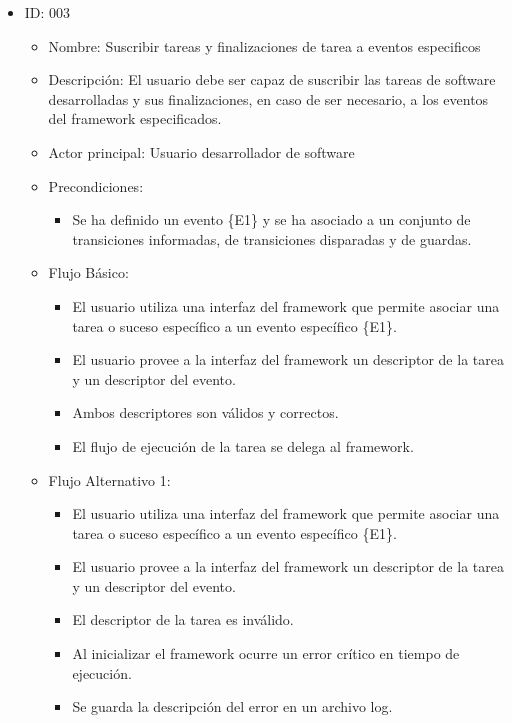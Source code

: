 \begin{itemize}
    \item ID: 003
    \begin{itemize}
        \item Nombre: Suscribir tareas y finalizaciones de tarea a
        eventos especificos
        \item Descripción: El usuario debe ser capaz de suscribir las tareas de
        software desarrolladas y sus finalizaciones, en caso de ser necesario, a
        los eventos del framework especificados.
       	\item Actor principal: Usuario desarrollador de software
       	\item Precondiciones: 
       		\begin{itemize}
       		    \item Se ha definido  un evento \{E1\} y se ha asociado a un
       		    conjunto de transiciones informadas, de transiciones disparadas y de guardas.
   		    \end{itemize}
    	\item Flujo Básico: 
       		\begin{itemize}
       		    \item El usuario utiliza una interfaz del framework que permite
       		    asociar una tarea o suceso específico a un evento específico
       		    \{E1\}.
       		    \item El usuario provee a la interfaz del framework un descriptor
       		    de la tarea y un descriptor del evento.
       		    \item Ambos descriptores son válidos y correctos.
       		    \item El flujo de ejecución de la tarea se delega al
       		    framework.
   		    \end{itemize}
       	\item Flujo Alternativo 1: 
       		\begin{itemize}
       		    \item El usuario utiliza una interfaz del framework que permite
       		    asociar una tarea o suceso específico a un evento específico
       		    \{E1\}.
       		    \item El usuario provee a la interfaz del framework un descriptor
       		    de la tarea y un descriptor del evento.
       		    \item El descriptor de la tarea es inválido.
       		    \item Al inicializar el framework ocurre un error crítico en tiempo
       		    de ejecución.
       		    \item Se guarda la descripción del error en un archivo log.

\end{itemize}
\end{itemize}
\end{itemize}
